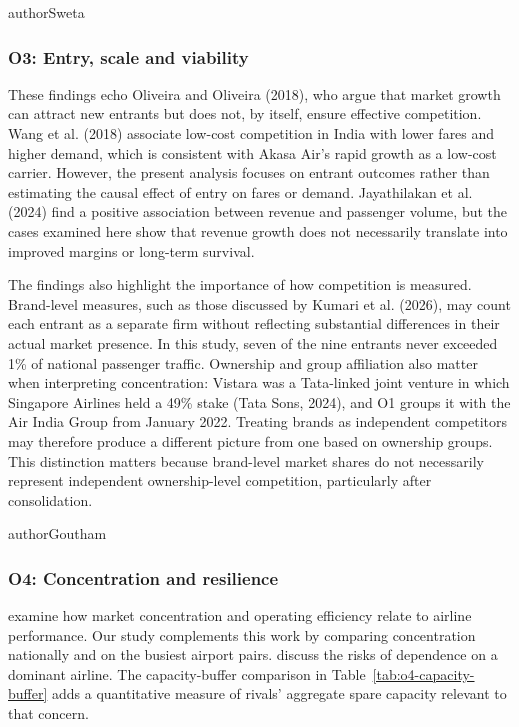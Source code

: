 \begin{mergedcontribution}{authorSweta}
\subsubsection{O3: Entry, scale and viability}
These findings echo Oliveira and Oliveira (2018), who argue that market growth can attract new entrants but does not, by itself, ensure effective competition. Wang et al. (2018) associate low-cost competition in India with lower fares and higher demand, which is consistent with Akasa Air's rapid growth as a low-cost carrier. However, the present analysis focuses on entrant outcomes rather than estimating the causal effect of entry on fares or demand. Jayathilakan et al. (2024) find a positive association between revenue and passenger volume, but the cases examined here show that revenue growth does not necessarily translate into improved margins or long-term survival.

The findings also highlight the importance of how competition is measured. Brand-level measures, such as those discussed by Kumari et al. (2026), may count each entrant as a separate firm without reflecting substantial differences in their actual market presence. In this study, seven of the nine entrants never exceeded 1\% of national passenger traffic. Ownership and group affiliation also matter when interpreting concentration: Vistara was a Tata-linked joint venture in which Singapore Airlines held a 49\% stake (Tata Sons, 2024), and O1 groups it with the Air India Group from January 2022. Treating brands as independent competitors may therefore produce a different picture from one based on ownership groups. This distinction matters because brand-level market shares do not necessarily represent independent ownership-level competition, particularly after consolidation.
\end{mergedcontribution}

\begin{mergedcontribution}{authorGoutham}
\subsubsection{O4: Concentration and resilience}
\textcite{kumari2026soaring} examine how market concentration and operating efficiency relate to airline performance. Our study complements this work by comparing concentration nationally and on the busiest airport pairs. \textcite{gupta2025antitrust} discuss the risks of dependence on a dominant airline. The capacity-buffer comparison in Table~\ref{tab:o4-capacity-buffer} adds a quantitative measure of rivals' aggregate spare capacity relevant to that concern.
\end{mergedcontribution}

